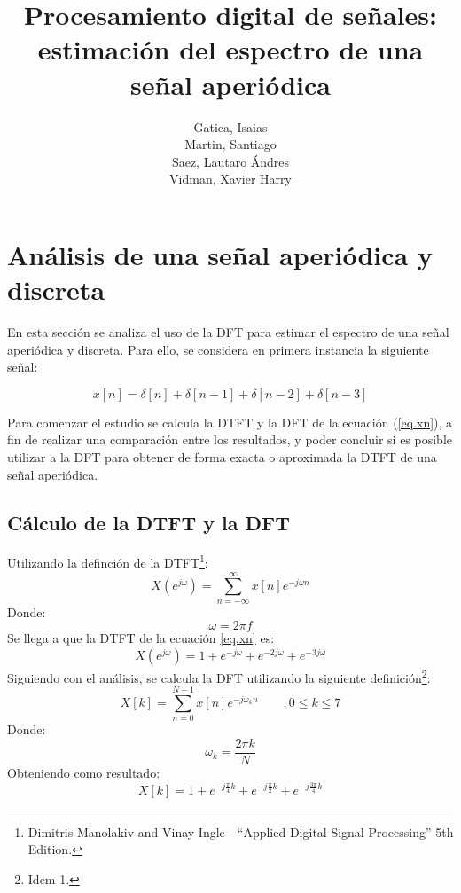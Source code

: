 \documentclass[11pt,a4paper]{article}
\author{Gatica, Isaias \\ Martin, Santiago \\ Saez, Lautaro Ándres \\ Vidman, Xavier Harry}
\title{Procesamiento digital de señales: estimación del espectro de una señal aperiódica}
\date{}
\begin{document}
\maketitle
\section{Análisis de una señal aperiódica y discreta}
En esta sección se analiza el uso de la DFT para estimar el espectro de una señal aperiódica y discreta. Para ello, se considera en primera instancia la siguiente señal:

\begin{equation}
    x[n]=\delta[n]+\delta[n-1]+\delta[n-2]+\delta[n-3]
    \label{eq.xn}
\end{equation}

Para comenzar el estudio se calcula la DTFT y la DFT de la ecuación (\ref{eq.xn}), a fin de realizar una comparación entre los resultados, y poder concluir si es posible utilizar a la DFT para obtener de forma exacta o aproximada la DTFT de una señal aperiódica.

    \subsection{Cálculo de la DTFT y la DFT}

    Utilizando la definción de la DTFT\footnote{Dimitris Manolakiv and Vinay Ingle - ``Applied Digital Signal Processing'' 5th Edition.}:
    \begin{equation}
        X(e^{j\omega})=\sum_{n=-\infty}^{\infty}x[n]e^{-j\omega n}
    \end{equation}
    Donde:
    \begin{equation}
        \label{omega}
        \omega=2\pi f
    \end{equation}
    Se llega a que la DTFT de la ecuación \ref{eq.xn} es:
    \begin{equation}
        X(e^{j\omega})=1+e^{-j\omega}+e^{-2j\omega}+e^{-3j\omega}
        \label{DTFT.R}
    \end{equation}
    Siguiendo con el análisis, se calcula la DFT utilizando la siguiente definición\footnote{Idem 1.}:
    \begin{equation}
        X[k]=\sum_{n=0}^{N-1}x[n]e^{-j\omega_k n} \qquad , 0 \leq k \leq 7
    \end{equation}
    Donde:
    \begin{equation}
        \label{omega.k}
        \omega_k=\frac{2\pi k}{N}
    \end{equation}
    Obteniendo como resultado:
    \begin{equation}
        \label{DFT.R}
        X[k]=1 + e^{-j \frac{\pi}{4} k} + e^{-j \frac{\pi}{2} k} + e^{-j \frac{3 \pi}{4} k}
    \end{equation}
    
\end{document}
